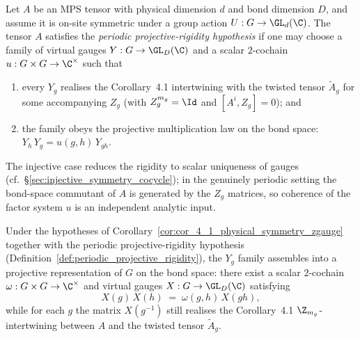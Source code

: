 \begin{definition}%
    \label{def:periodic_projective_rigidity}
    \leanok
    Let $A$ be an MPS tensor with physical dimension $d$ and bond dimension $D$,
    and assume it is on-site symmetric under a group action
    $U : G \to \GL_d(\C)$.  The tensor $A$ satisfies the
    \emph{periodic projective-rigidity hypothesis} if one may choose a
    family of virtual gauges $Y : G \to \GL_D(\C)$ and a scalar
    $2$-cochain $u : G \times G \to \C^{\times}$ such that

    \begin{enumerate}
        \item every $Y_g$ realises the Corollary~4.1 intertwining with
              the twisted tensor $\widetilde{A}_g$ for some accompanying
              $Z_g$ (with $Z_g^{m_g} = \Id$ and $[A^i, Z_g] = 0$); and
        \item the family obeys the projective multiplication law on the
              bond space: $Y_h\, Y_g = u(g, h)\, Y_{gh}$.
    \end{enumerate}

    The injective case reduces the rigidity to scalar uniqueness of
    gauges (cf.~\S\ref{sec:injective_symmetry_cocycle}); in the
    genuinely periodic setting the bond-space commutant of $A$ is
    generated by the $Z_g$ matrices, so coherence of the factor system
    $u$ is an independent analytic input.
\end{definition}

\begin{theorem}%
    \label{thm:cor_4_1_projective_rep}
    \leanok
    Under the hypotheses of Corollary~\ref{cor:cor_4_1_physical_symmetry_zgauge}
    together with the periodic projective-rigidity hypothesis
    (Definition~\ref{def:periodic_projective_rigidity}), the $Y_g$
    family assembles into a projective representation of $G$ on the
    bond space: there exist a scalar $2$-cochain
    $\omega : G \times G \to \C^{\times}$ and virtual gauges
    $X : G \to \GL_D(\C)$ satisfying
    \[
        X(g)\, X(h) \;=\; \omega(g, h)\, X(g h),
    \]
    while for each $g$ the matrix $X(g^{-1})$ still realises the
    Corollary~4.1 $\Z_{m_g}$-intertwining between $A$ and the twisted
    tensor $\widetilde{A}_g$.
\end{theorem}

